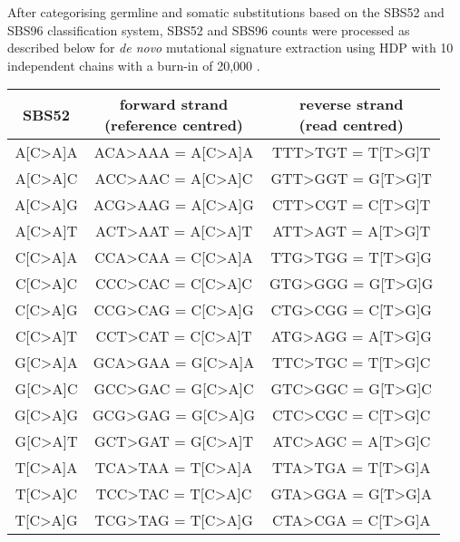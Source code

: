 After categorising germline and somatic substitutions based on the SBS52 and SBS96 classification system, SBS52 and SBS96 counts were processed as described below for \textit{de novo} mutational signature extraction using HDP with 10 independent chains with a burn-in of 20,000 \cite{}. 

\begingroup
\setlength{\LTleft}{-20cm plus -1fill} %
\setlength{\LTright}{\LTleft}
\begin{longtable}{c|c|c}
\label{tab:SBS52} \\ \smallskip
SBS52 & \makecell{forward strand \\ (reference centred)} & \makecell{reverse strand \\ (read centred)}  \\ \hline
\ttfamily A[C>A]A & \ttfamily ACA>AAA = A[C>A]A & \ttfamily TTT>TGT = T[T>G]T \\ \hline
\ttfamily A[C>A]C & \ttfamily ACC>AAC = A[C>A]C & \ttfamily GTT>GGT = G[T>G]T \\ \hline
\ttfamily A[C>A]G & \ttfamily ACG>AAG = A[C>A]G & \ttfamily CTT>CGT = C[T>G]T \\ \hline
\ttfamily A[C>A]T & \ttfamily ACT>AAT = A[C>A]T & \ttfamily ATT>AGT = A[T>G]T \\ \hline
\ttfamily C[C>A]A & \ttfamily CCA>CAA = C[C>A]A & \ttfamily TTG>TGG = T[T>G]G \\ \hline
\ttfamily C[C>A]C & \ttfamily CCC>CAC = C[C>A]C & \ttfamily GTG>GGG = G[T>G]G \\ \hline
\ttfamily C[C>A]G & \ttfamily CCG>CAG = C[C>A]G & \ttfamily CTG>CGG = C[T>G]G \\ \hline
\ttfamily C[C>A]T & \ttfamily CCT>CAT = C[C>A]T & \ttfamily ATG>AGG = A[T>G]G \\ \hline
\ttfamily G[C>A]A & \ttfamily GCA>GAA = G[C>A]A & \ttfamily TTC>TGC = T[T>G]C \\ \hline
\ttfamily G[C>A]C & \ttfamily GCC>GAC = G[C>A]C & \ttfamily GTC>GGC = G[T>G]C \\ \hline
\ttfamily G[C>A]G & \ttfamily GCG>GAG = G[C>A]G & \ttfamily CTC>CGC = C[T>G]C \\ \hline
\ttfamily G[C>A]T & \ttfamily GCT>GAT = G[C>A]T & \ttfamily ATC>AGC = A[T>G]C \\ \hline
\ttfamily T[C>A]A & \ttfamily TCA>TAA = T[C>A]A & \ttfamily TTA>TGA = T[T>G]A \\ \hline
\ttfamily T[C>A]C & \ttfamily TCC>TAC = T[C>A]C & \ttfamily GTA>GGA = G[T>G]A \\ \hline
\ttfamily T[C>A]G & \ttfamily TCG>TAG = T[C>A]G & \ttfamily CTA>CGA = C[T>G]A \\ \hline

\end{longtable}
